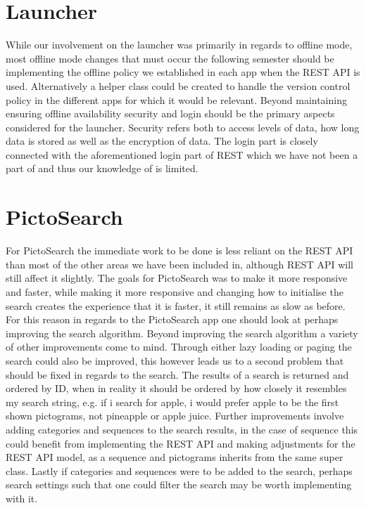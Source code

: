 \section{Launcher}
While our involvement on the launcher was primarily in regards to offline mode, most offline mode changes that must occur the following semester should be implementing the offline policy we established in each app when the REST API is used.
Alternatively a helper class could be created to handle the version control policy in the different apps for which it would be relevant.
Beyond maintaining ensuring offline availability security and login should be the primary aspects considered for the launcher.
Security refers both to access levels of data, how long data is stored as well as the encryption of data.
The login part is closely connected with the aforementioned login part of REST which we have not been a part of and thus our knowledge of is limited.

\section{PictoSearch}
For PictoSearch the immediate work to be done is less reliant on the REST API than most of the other areas we have been included in, although REST API will still affect it slightly.
The goals for PictoSearch was to make it more responsive and faster, while making it more responsive and changing how to initialise the search creates the experience that it is faster, it still remains as slow as before.
For this reason in regards to the PictoSearch app one should look at perhaps improving the search algorithm.
Beyond improving the search algorithm a variety of other improvements come to mind.
Through either lazy loading or paging the search could also be improved, this however leads us to a second problem that should be fixed in regards to the search.
The results of a search is returned and ordered by ID, when in reality it should be ordered by how closely it resembles my search string, e.g. if i search for apple, i would prefer apple to be the first shown pictograms, not pineapple or apple juice.
Further improvements involve adding categories and sequences to the search results, in the case of sequence this could benefit from implementing the REST API and making adjustments for the REST API model, as a sequence and pictograms inherits from the same super class.
Lastly if categories and sequences were to be added to the search, perhaps search settings such that one could filter the search may be worth implementing with it.

